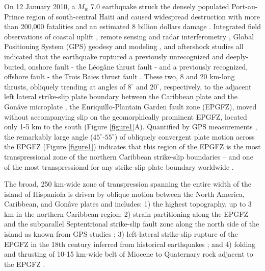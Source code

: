 \documentclass{nature}
\begin{document}
On 12 January 2010, a $M_w$ 7.0 earthquake struck the densely populated Port-au-Prince region of south-central Haiti and caused widespread destruction with more than 200,000 fatalities and an estimated 8 billion dollars damage  \citep{prentice2010seismic,kocel2016near}. 
Integrated field observations of coastal uplift  \citep{hayes2010complex,hashimoto2011fan}, remote sensing and radar interferometry  \citep{cowgill2012interactive}, Global Positioning System (GPS) geodesy and modeling \citep{calais2010transpressional,hayes2010complex,prentice2010seismic,symithe2013coseismic,douilly2013crustal,douilly2015three}, and aftershock studies \citep{calais2010transpressional,hayes2010complex,douilly2013crustal,douilly20163d} all indicated that the earthquake ruptured a previously unrecognized and deeply-buried, onshore fault - the L\'eog\^ane thrust fault - and a previously recognized, offshore fault - the Trois Baies thrust fault \citep{mercier20112010,symithe2013coseismic}. These two, 8 and 20 km-long thrusts, obliquely trending at angles of $8^{\circ}$ and $20^{\circ}$, respectively, to the adjacent left lateral strike-slip plate boundary between the Caribbean plate and the Gon\^ave microplate \citep{mann1995actively,calais2010transpressional,benford2012gps}, the Enriquillo-Plantain Garden fault zone (EPGFZ), moved without accompanying slip \citep{calais2010transpressional,hayes2010complex,prentice2010seismic} on the geomorphically prominent EPGFZ, located only 1-5 km to the south (Figure \ref{figure1}A). Quantified by GPS measurements \citep{calais2010transpressional}, the remarkably large angle ($45^{\circ}$-$55^{\circ}$) of obliquely convergent plate motion across the EPGFZ (Figure \ref{figure1}) indicates that this region of the EPGFZ is the most transpressional zone of the northern Caribbean strike-slip boundaries \citep{mann2002oblique} -- and one of the most transpressional for any strike-slip plate boundary worldwide \citep{mann2007overview}.  

The broad, 250 km-wide zone of transpression spanning the entire width of the island of Hispaniola is driven by oblique motion between the North America, Caribbean, and Gon\^ave plates and includes: 1) the highest topography, up to 3 km in the northern Caribbean region; 2) strain partitioning along the EPGFZ and the subparallel Septentrional strike-slip fault zone along the north side of the island as known from GPS studies \citep{calais2010transpressional,hayes2010complex,prentice2010seismic,symithe2013coseismic,douilly2013crustal,douilly2015three}; 3) left-lateral strike-slip rupture of the EPGFZ in the 18th century inferred from historical earthquakes \citep{prentice2010seismic}; and 4) folding and thrusting of 10-15 km-wide belt of Miocene to Quaternary rock adjacent to the EPGFZ \citep{saint2015seismotectonics}.
\end{document}
